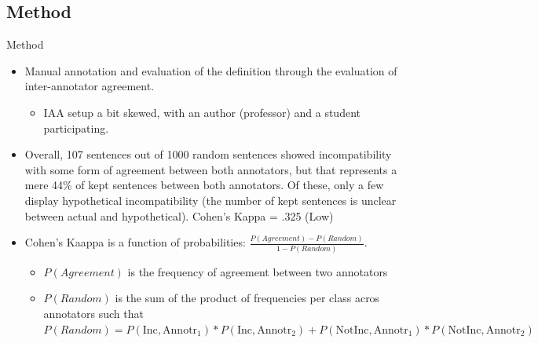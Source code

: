 \documentclass[aspectratio=169]{beamer}
\begin{document}
\subsection{Method}

\begin{frame}{Method}
    \begin{itemize}
        \item Manual annotation and evaluation of the definition through the evaluation of inter-annotator agreement.
        \begin{itemize}
            \item IAA setup a bit skewed, with an author (professor) and a student participating.
        \end{itemize}
        \item Overall, 107 sentences out of 1000 random sentences showed incompatibility with some form of agreement between both annotators, but that represents a mere 44\% of kept sentences between both annotators. Of these, only a few display hypothetical incompatibility (the number of kept sentences is unclear between actual and hypothetical). Cohen's Kappa = .325 (Low)
        \item Cohen's Kaappa is a function of probabilities: $\frac{P(Agreement) - P(Random)}{1 - P(Random)}$. 
        \begin{itemize}
            \item $P(Agreement)$ is the frequency of agreement between two annotators
            \item $P(Random)$ is the sum of the product of frequencies per class acros annotators such that $P(Random) = P(\text{Inc}, \text{Annotr}_{1}) * P(\text{Inc}, \text{Annotr}_{2}) + P(\text{NotInc}, \text{Annotr}_{1}) * P(\text{NotInc}, \text{Annotr}_{2})$
        \end{itemize}
    \end{itemize}    
\end{frame}
\end{document}
